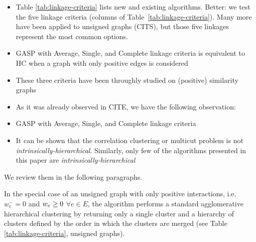 \begin{itemize}
\item Table \ref{tab:linkage-criteria} lists new and existing algorithms. Better: we test the five linkage criteria (columns of Table~\ref{tab:linkage-criteria}). Many more have been applied to unsigned graphs (CITS), but those five linkages represent the most common options.  
\item GASP with Average, Single, and Complete linkage criteria is equivalent to HC when a graph with only positive edges is considered
\item These three criteria have been throughly studied on (positive) similarity graphs
\item As it was already observed in CITE, we have the following observation:
\item GASP with Average, Single, and Complete linkage criteria 

\item It can be shown that the correlation clustering or multicut problem is not \emph{intrinsically-hierarchical}. Similarly, only few of the algorithms presented in this paper are \emph{intrinsically-hierarchical}
\end{itemize}


  We review them in the following paragraphs.

In the special case of an unsigned graph with only positive interactions, i.e. $w_e^-=0$ and $w_e \geq 0$ $\forall e\in E$, 
 the algorithm performs a standard agglomerative hierarchical clustering by returning only a single cluster and a hierarchy of clusters defined by the order in which the clusters are merged (see Table \ref{tab:linkage-criteria}, unsigned graphs).

